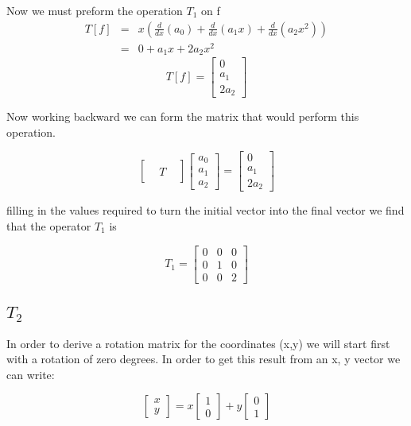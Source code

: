 \documentclass[12pt]{article}
\begin{document}
Now we must preform the operation $T_{1}$ on f\\

\begin{eqnarray*}
T[f] &=& x( \frac{d}{dx}(a_{0}) + \frac{d}{dx}(a_{1}x) + \frac{d}{dx}(a_{2}x^{2}) )\\
&=&		0 + a_{1}x + 2a_{2}x^{2}
\end{eqnarray*}
\[
T[f] = 
\begin{bmatrix}
0\\
a_{1}\\
2a_{2}
\end{bmatrix}
\]

Now working backward we can form the matrix that would perform this operation.

\[
\begin{bmatrix}
 & & \\
 &T& \\
 & & 
\end{bmatrix}
\begin{bmatrix}
a_{0}\\
a_{1}\\
a_{2}
\end{bmatrix}
=
\begin{bmatrix}
0\\
a_{1}\\
2a_{2}
\end{bmatrix}
\]

filling in the values required to turn the initial vector into the final vector we find that the operator $T_{1}$ is

\[
T_{1} = 
\begin{bmatrix}
0 & 0 & 0\\
0 & 1 & 0\\
0 & 0 & 2
\end{bmatrix}
\]

\subsection{$T_{2}$}

In order to derive a rotation matrix for the coordinates (x,y) we will start first with a rotation of zero degrees. In order to get this result from an x, y vector we can write:

\[
\begin{bmatrix}
x\\
y
\end{bmatrix}
=
x
\begin{bmatrix}
1\\
0
\end{bmatrix}
+
y
\begin{bmatrix}
0\\
1
\end{bmatrix}
\]
\end{document}
